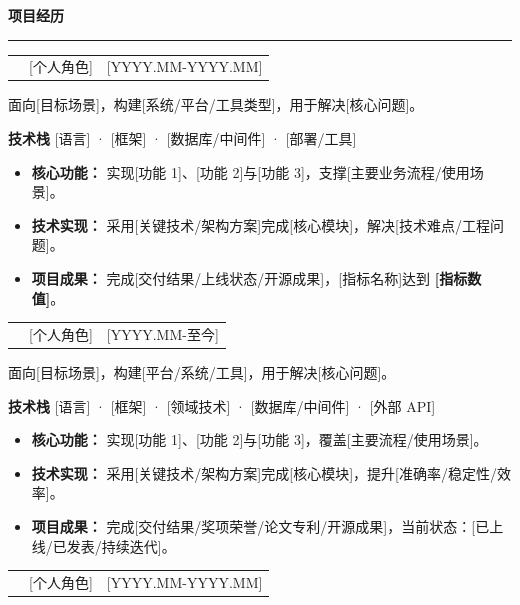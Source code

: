 \documentclass[11pt,a4paper]{ctexart}
\makeatletter
\newcommand{\resumeSection}[1]{%
  \par\vspace{0.58em}
  \noindent
  {\fontsize{14.2pt}{16.5pt}\selectfont\bfseries
    \textcolor{ResumeAccent}{\raisebox{-0.10em}{\rule{3.8pt}{1.04em}}}
    \hspace{0.48em}#1
  }
  \par\vspace{-0.40em}
  \textcolor{ResumeAccent}{\rule{\textwidth}{0.58pt}}
  \par\vspace{0.10em}
}
\newcommand{\dateText}[1]{%
  {\small\textcolor{TextGray}{\mbox{#1}}}%
}
\newcommand{\projectHeader}[3]{%
  \par\vspace{0.36em}
  \noindent
  \begin{tabularx}{\textwidth}
    {@{}>{\raggedright\arraybackslash}X
        >{\centering\arraybackslash}p{2.2cm}
        r@{}}
    {\large\bfseries #1}
    &
    {\textcolor{TextGray}{#2}}
    &
    {\dateText{#3}}
  \end{tabularx}
  \par\vspace{0.12em}
}
\newcommand{\projectSummary}[1]{%
  \noindent
  \textcolor{TextGray}{#1}
  \par\vspace{0.38em}
}
\newcommand{\projectTech}[1]{%
  \noindent
  {\small
    \textcolor{ResumeAccent}{\textbf{技术栈}}
    \hspace{0.6em}
    \textcolor{TextGray}{#1}
  }
  \par\vspace{0.25em}
}
\newcommand{\githubProject}[2]{%
  \href{#2}{%
    \textcolor{TextBlack}{#1}%
    \,\textcolor{ResumeAccent}{\raisebox{0.15em}{\scriptsize$\nearrow$}}%
  }%
}
\makeatother
\begin{document}
\resumeSection{项目经历}

\projectHeader
{
  \githubProject
    {[EnglishName]}
    {https://github.com/yourname/project-a}
  ｜[项目全称]
}
{[个人角色]}
{[YYYY.MM-YYYY.MM]}

\projectSummary{%
  面向[目标场景]，构建[系统/平台/工具类型]，用于解决[核心问题]。%
}

\projectTech{
  [语言] · [框架] · [数据库/中间件] · [部署/工具]
}

\begin{itemize}

\item
\textbf{核心功能：}
实现[功能 1]、[功能 2]与[功能 3]，支撑[主要业务流程/使用场景]。

\item
\textbf{技术实现：}
采用[关键技术/架构方案]完成[核心模块]，解决[技术难点/工程问题]。

\item
\textbf{项目成果：}
完成[交付结果/上线状态/开源成果]，[指标名称]达到 \textbf{[指标数值]}。

\end{itemize}

\projectHeader
{
  \githubProject
    {[EnglishName]}
    {https://github.com/yourname/project-b}
  ｜[项目全称]
}
{[个人角色]}
{[YYYY.MM-至今]}

\projectSummary{
  面向[目标场景]，构建[平台/系统/工具]，用于解决[核心问题]。
}

\projectTech{
[语言] · [框架] · [领域技术] · [数据库/中间件] · [外部 API]
}

\begin{itemize}

\item
\textbf{核心功能：}
实现[功能 1]、[功能 2]与[功能 3]，覆盖[主要流程/使用场景]。

\item
\textbf{技术实现：}
采用[关键技术/架构方案]完成[核心模块]，提升[准确率/稳定性/效率]。

\item
\textbf{项目成果：}
完成[交付结果/奖项荣誉/论文专利/开源成果]，当前状态：[已上线/已发表/持续迭代]。

\end{itemize}

\projectHeader
{
  \githubProject
    {[EnglishName]}
    {https://github.com/yourname/project-c}
  ｜[项目全称]
}
{[个人角色]}
{[YYYY.MM-YYYY.MM]}
\end{document}
